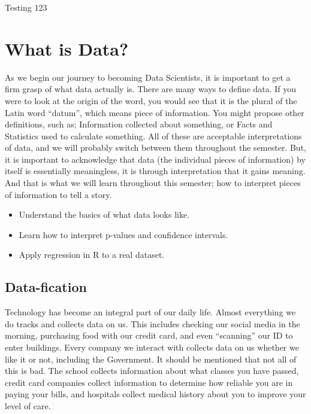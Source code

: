 \documentclass[
  letterpaper,
  DIV=11,
  numbers=noendperiod]{scrreprt}
\providecommand{\tightlist}{%
  \setlength{\itemsep}{0pt}\setlength{\parskip}{0pt}}
\begin{document}
Testing 123


\chapter{What is Data?}\label{what-is-data}

As we begin our journey to becoming Data Scientists, it is important to
get a firm grasp of what data actually is. There are many ways to define
data. If you were to look at the origin of the word, you would see that
it is the plural of the Latin word ``datum'', which means piece of
information. You might propose other definitions, such as; Information
collected about something, or Facts and Statistics used to calculate
something. All of these are acceptable interpretations of data, and we
will probably switch between them throughout the semester. But, it is
important to acknowledge that data (the individual pieces of
information) by itself is essentially meaningless, it is through
interpretation that it gains meaning. And that is what we will learn
throughout this semester; how to interpret pieces of information to tell
a story.

\begin{itemize}
\tightlist
\item
  Understand the basics of what data looks like.
\item
  Learn how to interpret p-values and confidence intervals.
\item
  Apply regression in R to a real dataset.
\end{itemize}

\section{Data-fication}\label{data-fication}

Technology has become an integral part of our daily life. Almost
everything we do tracks and collects data on us. This includes checking
our social media in the morning, purchasing food with our credit card,
and even ``scanning'' our ID to enter buildings. Every company we
interact with collects data on us whether we like it or not, including
the Government. It should be mentioned that not all of this is bad. The
school collects information about what classes you have passed, credit
card companies collect information to determine how reliable you are in
paying your bills, and hospitals collect medical history about you to
improve your level of care.
\end{document}
